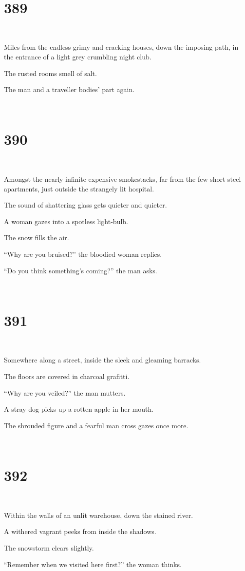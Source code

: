 \documentclass{report}
\begin{document}
~
\chapter*{389}
~

Miles from the endless grimy and cracking houses, down the imposing path, in the entrance of a light grey crumbling night club.

The rusted rooms smell of salt.

The man and a traveller bodies' part again.

~
\chapter*{390}
~

Amongst the nearly infinite expensive smokestacks, far from the few short steel apartments, just outside the strangely lit hospital.

The sound of shattering glass gets quieter and quieter.

A woman gazes into a spotless light-bulb.

The snow fills the air.

``Why are you bruised?'' the bloodied woman replies.

``Do you think something's coming?'' the man asks.

~
\chapter*{391}
~

Somewhere along a street, inside the sleek and gleaming barracks.

The floors are covered in charcoal grafitti.

``Why are you veiled?'' the man mutters.

A stray dog picks up a rotten apple in her mouth.

The shrouded figure and a fearful man cross gazes once more.

~
\chapter*{392}
~

Within the walls of an unlit warehouse, down the stained river.

A withered vagrant peeks from inside the shadows.

The snowstorm clears slightly.

``Remember when we visited here first?'' the woman thinks.
\end{document}

